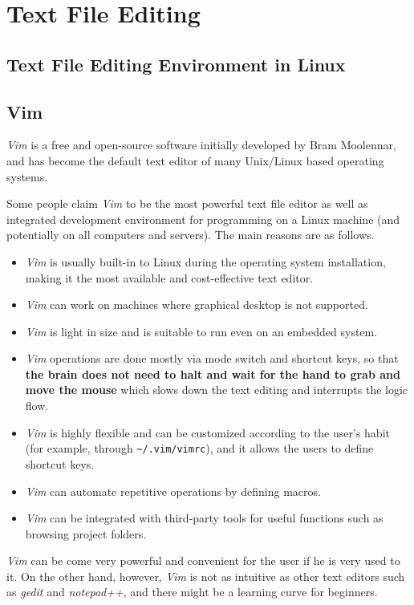 \chapter{Text File Editing}


\section{Text File Editing Environment in Linux}

\section{Vim}

\textit{Vim} is a free and open-source software initially developed by Bram Moolennar, and has become the default text editor of many Unix/Linux based operating systems.

Some people claim \textit{Vim} to be the most powerful text file editor as well as integrated development environment for programming on a Linux machine (and potentially on all computers and servers). The main reasons are as follows.
\begin{itemize}
  \item \textit{Vim} is usually built-in to Linux during the operating system installation, making it the most available and cost-effective text editor.
  \item \textit{Vim} can work on machines where graphical desktop is not supported.
  \item \textit{Vim} is light in size and is suitable to run even on an embedded system.
  \item \textit{Vim} operations are done mostly via mode switch and shortcut keys, so that \textbf{the brain does not need to halt and wait for the hand to grab and move the mouse} which slows down the text editing and interrupts the logic flow.
  \item \textit{Vim} is highly flexible and can be customized according to the user's habit (for example, through \verb|~/.vim/vimrc|), and it allows the users to define shortcut keys.
  \item \textit{Vim} can automate repetitive operations by defining macros.
  \item \textit{Vim} can be integrated with third-party tools for useful functions such as browsing project folders.
\end{itemize}
\textit{Vim} can be come very powerful and convenient for the user if he is very used to it. On the other hand, however, \textit{Vim} is not as intuitive as other text editors such as \textit{gedit} and \textit{notepad++}, and there might be a learning curve for beginners.

